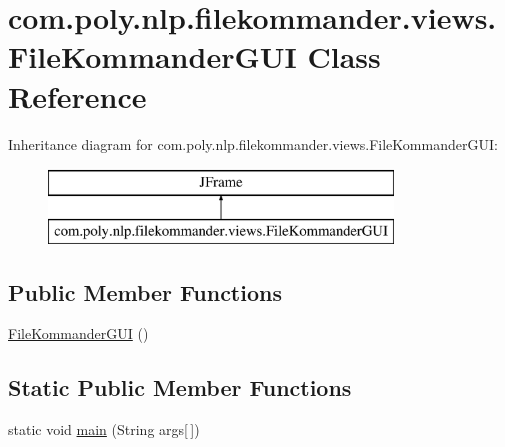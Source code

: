\hypertarget{classcom_1_1poly_1_1nlp_1_1filekommander_1_1views_1_1_file_kommander_g_u_i}{\section{com.\-poly.\-nlp.\-filekommander.\-views.\-File\-Kommander\-G\-U\-I Class Reference}
\label{classcom_1_1poly_1_1nlp_1_1filekommander_1_1views_1_1_file_kommander_g_u_i}
}
Inheritance diagram for com.\-poly.\-nlp.\-filekommander.\-views.\-File\-Kommander\-G\-U\-I\-:\begin{figure}[H]
\begin{center}
\leavevmode
\includegraphics[height=2.000000cm]{classcom_1_1poly_1_1nlp_1_1filekommander_1_1views_1_1_file_kommander_g_u_i}
\end{center}
\end{figure}
\subsection*{Public Member Functions}
\begin{DoxyCompactItemize}
\item 
\hyperlink{classcom_1_1poly_1_1nlp_1_1filekommander_1_1views_1_1_file_kommander_g_u_i_a2bd0826d88caa357927705d7f14578f8}{File\-Kommander\-G\-U\-I} ()
\end{DoxyCompactItemize}
\subsection*{Static Public Member Functions}
\begin{DoxyCompactItemize}
\item 
static void \hyperlink{classcom_1_1poly_1_1nlp_1_1filekommander_1_1views_1_1_file_kommander_g_u_i_acaf5e921301a8f0565f772db5acd6a2b}{main} (String args\mbox{[}$\,$\mbox{]})
\end{DoxyCompactItemize}
